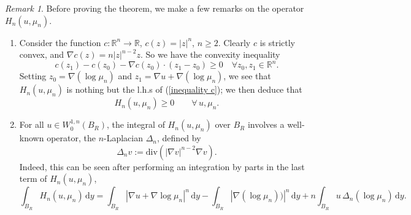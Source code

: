 \documentclass[10pt]{article}
\numberwithin{equation}{section}
\theoremstyle{plain}
\theoremstyle{definition}
\theoremstyle{remark}
\newtheorem{rem}[thm]{Remark}
\newcommand\R{{\mathbb R}}
\newcommand{\ib}{\int_{B_R}}
\newcommand\dd{\,\mbox{d} }
\def\div{\mbox{div} }
\begin{document}
\begin{rem} Before proving the theorem, we make a few  remarks on the operator $H_n(u,\mu_n)$.
\begin{enumerate}
\item Consider the function $c:\R^n \rightarrow \R$, $c(z)=|z|^n$, $n\geq 2$. Clearly $c$ is strictly convex, and $\nabla c(z)=n|z|^{n-2}z$. So we have the convexity inequality
\begin{equation}\label{inequality c}
c(z_1) - c(z_0) -\nabla c(z_0) \cdot (z_1-z_0) \geq 0 \quad \forall z_0, z_1\in \R^n.
\end{equation}
Setting $z_0=\nabla(\log\mu_n)$ and $z_1=\nabla u +\nabla(\log\mu_n)$, we see that $H_n(u,\mu_n)$ is nothing but the l.h.s of (\ref{inequality c}); we then deduce that
\[ H_n(u,\mu_n) \geq 0 \qquad  \forall \, u, \mu_n.\]
\item For all $u\in  W^{1,n}_0(B_R)$, the integral of $H_n(u,\mu_n)$ over $B_R$ involves a well-known operator, the $n$-Laplacian $\Delta_n$, defined by
\begin{equation}\label{eqn n-laplacian}
\Delta_n v := \div(|\nabla v|^{n-2} \nabla v).
\end{equation}
Indeed, this can be seen after performing an integration by parts in the last term of $H_n(u,\mu_n)$,
\[\ib H_n(u,\mu_n) \dd y =  \ib |\nabla u +\nabla \log \mu_n|^n \dd y - \ib |\nabla(\log\mu_n))|^n\dd y   + n\ib u\, \Delta_n(\log\mu_n)\dd y.\]
\end{enumerate}
\end{rem}
\end{document}
